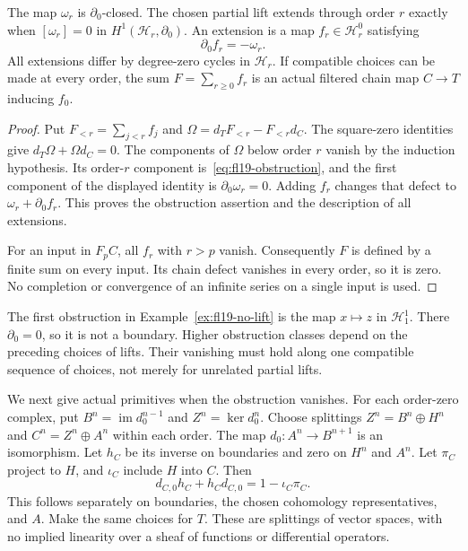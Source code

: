 \begin{theorem}\label{thm:fl19-lift-obstruction}
The map $\omega_r$ is $\partial_0$-closed.
The chosen partial lift extends through order $r$ exactly when
$[\omega_r]=0$ in $H^1(\mathcal H_r,\partial_0)$.
An extension is a map $f_r\in\mathcal H_r^0$ satisfying
\begin{equation}\label{eq:fl19-lift-equation}
\partial_0 f_r=-\omega_r.
\end{equation}
All extensions differ by degree-zero cycles in $\mathcal H_r$.
If compatible choices can be made at every order, the sum $F=\sum_{r\ge0}f_r$ is an actual filtered chain map $C\to T$ inducing $f_0$.
\end{theorem}
\begin{proof}
Put $F_{<r}=\sum_{j<r}f_j$ and $\Omega=d_TF_{<r}-F_{<r}d_C$.
The square-zero identities give $d_T\Omega+\Omega d_C=0$.
The components of $\Omega$ below order $r$ vanish by the induction hypothesis.
Its order-$r$ component is~\eqref{eq:fl19-obstruction}, and the first component of the displayed identity is $\partial_0\omega_r=0$.
Adding $f_r$ changes that defect to $\omega_r+\partial_0f_r$.
This proves the obstruction assertion and the description of all extensions.

For an input in $F_pC$, all $f_r$ with $r>p$ vanish.
Consequently $F$ is defined by a finite sum on every input.
Its chain defect vanishes in every order, so it is zero.
No completion or convergence of an infinite series on a single input is used.
\end{proof}

The first obstruction in Example~\ref{ex:fl19-no-lift} is the map $x\mapsto z$ in $\mathcal H_1^1$.
There $\partial_0=0$, so it is not a boundary.
Higher obstruction classes depend on the preceding choices of lifts.
Their vanishing must hold along one compatible sequence of choices, not merely for unrelated partial lifts.

We next give actual primitives when the obstruction vanishes.
For each order-zero complex, put $B^n=\operatorname{im}d_0^{n-1}$ and $Z^n=\ker d_0^n$.
Choose splittings
$Z^n=B^n\oplus H^n$ and $C^n=Z^n\oplus A^n$ within each order.
The map $d_0:A^n\to B^{n+1}$ is an isomorphism.
Let $h_C$ be its inverse on boundaries and zero on $H^n$ and $A^n$.
Let $\pi_C$ project to $H$, and $\iota_C$ include $H$ into $C$.
Then
\[
d_{C,0}h_C+h_Cd_{C,0}=1-\iota_C\pi_C.
\]
This follows separately on boundaries, the chosen cohomology representatives, and $A$.
Make the same choices for $T$.
These are splittings of vector spaces, with no implied linearity over a sheaf of functions or differential operators.

